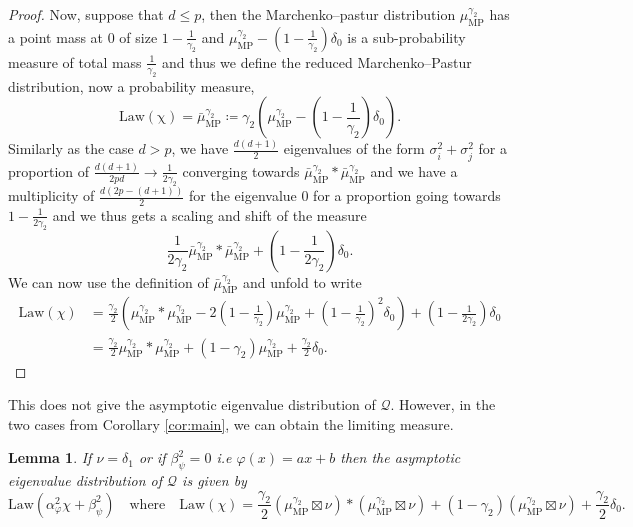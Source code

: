 \documentclass[letterpaper, 10pt, dvipsnames]{article}
\numberwithin{equation}{section}
\newcommand{\Q}{\mathcal{Q}}
\renewcommand{\phi}{\varphi}
\newtheorem{lem}[ccounter]{Lemma}
\theoremstyle{definition}
\begin{document}
\begin{proof}
  Now, suppose that $d\leqslant p$, then the Marchenko--pastur distribution $\mu_{\mathrm{MP}}^{\gamma_2}$ has a point mass at 0 of size $1-\frac{1}{\gamma_2}$ and $\mu_{\mathrm{MP}}^{\gamma_2}-\left(1-\frac{1}{\gamma_2}\right)\delta_0$ is a sub-probability measure of total mass $\frac{1}{\gamma_2}$ and thus we define the reduced Marchenko--Pastur distribution, now a probability measure, 
  \begin{equation}\label{eq:defmubar}
  \mathrm{Law(\chi)}=\bar{\mu}_{\mathrm{MP}}^{\gamma_2} 
  \coloneqq
  \gamma_2\left( 
    \mu_{\mathrm{MP}}^{\gamma_2}-
    \left(
      1-\frac{1}{\gamma_2}
    \right)
      \delta_0
  \right).
  \end{equation}
  Similarly as the case $d>p$, we have $\frac{d(d+1)}{2}$ eigenvalues of the form $\sigma_i^2+\sigma_j^2$ for a proportion of $\frac{d(d+1)}{2pd}\to \frac{1}{2\gamma_2}$ converging towards $\bar{\mu}_{\mathrm{MP}}^{\gamma_2}\ast \bar{\mu}_{\mathrm{MP}}^{\gamma_2}$ and we have a multiplicity of $\frac{d(2p-(d+1))}{2}$ for the eigenvalue 0 for a proportion going towards $1-\frac{1}{2\gamma_2}$ and we thus gets a scaling and shift of the measure 
  \[
  \frac{1}{2\gamma_2}\bar{\mu}_{\mathrm{MP}}^{\gamma_2}\ast \bar{\mu}_{\mathrm{MP}}^{\gamma_2}
  +
  \left(
    1-\frac{1}{2\gamma_2}
  \right)\delta_0.
  \] 
  We can now use the definition of $\bar{\mu}_{\mathrm{MP}}^{\gamma_2}$ and unfold to write
  \begin{align*}
  \mathrm{Law}(\chi) &= \frac{\gamma_2}{2}\left(
    \mu_{\mathrm{MP}}^{\gamma_2}\ast \mu_{\mathrm{MP}}^{\gamma_2}
    -2\left(1-\frac{1}{\gamma_2}\right)\mu_{\mathrm{MP}}^{\gamma_2}
    +\left(1-\frac{1}{\gamma_2}\right)^2\delta_0
  \right)
  +
  \left(1-\frac{1}{2\gamma_2}\right)\delta_0
  \\&= 
  \frac{\gamma_2}{2}
  \mu_{\mathrm{MP}}^{\gamma_2}\ast \mu_{\mathrm{MP}}^{\gamma_2}
  +
  (1-\gamma_2)\mu_{\mathrm{MP}}^{\gamma_2}
  +
  \frac{\gamma_2}{2}\delta_0.
  \end{align*}
\end{proof}
This does not give the asymptotic eigenvalue distribution of $\Q$. However, in the two cases from Corollary \ref{cor:main}, we can obtain the limiting measure.
\begin{lem}
  If $\nu=\delta_1$ or if $\beta_\psi^2=0$ i.e $\varphi(x)=ax+b$ then the asymptotic eigenvalue distribution of $\Q$ is given by 
  \[
  \mathrm{Law}\left( \alpha_\phi^2 \chi + \beta_\psi^2\right)
  \quad\text{where}\quad
  \mathrm{Law}(\chi) = \frac{\gamma_2}{2} (\mu_{\mathrm{MP}}^{\gamma_2} \boxtimes \nu) * (\mu_{\mathrm{MP}}^{\gamma_2} \boxtimes \nu) + (1-\gamma_2) (\mu_{\mathrm{MP}}^{\gamma_2} \boxtimes \nu) + \frac{\gamma_2}{2} \delta_0.
  \]
\end{lem}
\end{document}
